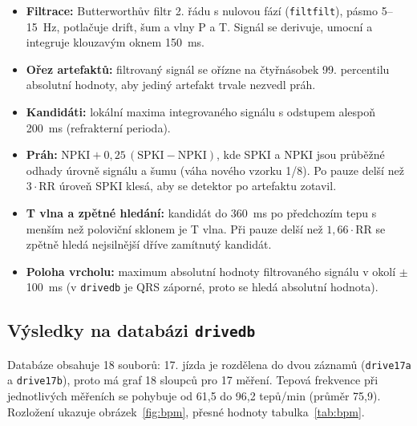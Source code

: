 \documentclass[11pt,a4paper]{article}
\begin{document}
\begin{itemize}
  \item \textbf{Filtrace:} Butterworthův filtr 2. řádu s nulovou fází (\texttt{filtfilt}), pásmo 5--15~Hz,
        potlačuje drift, šum a vlny P a T. Signál se derivuje, umocní a integruje klouzavým oknem
        150~ms.
  \item \textbf{Ořez artefaktů:} filtrovaný signál se ořízne na čtyřnásobek 99. percentilu absolutní
        hodnoty, aby jediný artefakt trvale nezvedl práh.
  \item \textbf{Kandidáti:} lokální maxima integrovaného signálu s odstupem alespoň 200~ms
        (refrakterní perioda).
  \item \textbf{Práh:} $\mathrm{NPKI} + 0{,}25\,(\mathrm{SPKI}-\mathrm{NPKI})$, kde SPKI a NPKI jsou
        průběžné odhady úrovně signálu a šumu (váha nového vzorku 1/8). Po pauze delší než
        $3\cdot$RR úroveň SPKI klesá, aby se detektor po artefaktu zotavil.
  \item \textbf{T vlna a zpětné hledání:} kandidát do 360~ms po předchozím tepu s menším než
        poloviční sklonem je T vlna. Při pauze delší než $1{,}66\cdot$RR se zpětně hledá nejsilnější
        dříve zamítnutý kandidát.
  \item \textbf{Poloha vrcholu:} maximum absolutní hodnoty filtrovaného signálu v okolí $\pm$100~ms
        (v \texttt{drivedb} je QRS záporné, proto se hledá absolutní hodnota).
\end{itemize}

\subsection{Výsledky na databázi \texttt{drivedb}}
Databáze obsahuje 18 souborů: 17. jízda je rozdělena do dvou záznamů (\texttt{drive17a} a
\texttt{drive17b}), proto má graf 18 sloupců pro 17 měření.
Tepová frekvence při jednotlivých měřeních se pohybuje od 61,5 do 96,2 tepů/min (průměr 75,9).
Rozložení ukazuje obrázek~\ref{fig:bpm}, přesné hodnoty tabulka~\ref{tab:bpm}.
\end{document}

